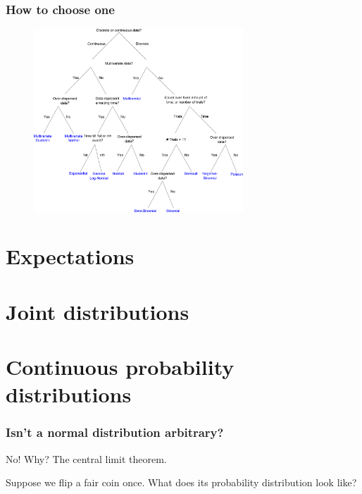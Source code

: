\documentclass{beamer}
\begin{document}
	\begin{frame}
		\frametitle{How to choose one}
		
		\begin{figure}[h]
			\centerline{\includegraphics[width=0.7\textwidth]{figures/Distributions_likelihoodTree.pdf}}
		\end{figure}
		
	\end{frame}
	
	\section{Expectations}
	\frame{\tableofcontents[currentsection]}

	\section{Joint distributions}
	\frame{\tableofcontents[currentsection]}
	
	\section{Continuous probability distributions}
	\frame{\tableofcontents[currentsection]}
	
	\begin{frame}
		\frametitle{Isn't a normal distribution arbitrary?}
		
		No! Why? The central limit theorem. 
		
		\vspace{0.5cm}
		
		Suppose we flip a fair coin once. What does its probability distribution look like?
		
	\end{frame}
	
\end{document}
